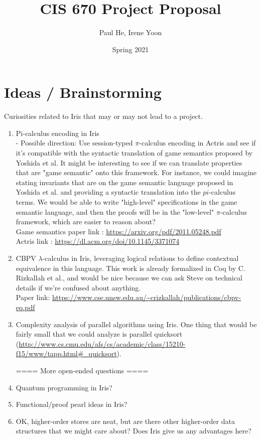\documentclass[11pt,twoside]{article}
\begin{document}
\title{CIS 670 Project Proposal}
\author{Paul He, Irene Yoon}
\date{Spring 2021}

\maketitle{}


\section{Ideas / Brainstorming}
Curiosities related to Iris that may or may not lead to a 
project.
\begin{enumerate} 
    \item Pi-calculus encoding in Iris \\
    - Possible direction: Use session-typed $\pi$-calculus encoding in Actris
    and see if it's compatible with the syntactic translation of game 
    semantics proposed by Yoshida et al. It might be interesting to see
    if we can translate properties that are "game semantic" onto this 
    framework.
    For instance, we could imagine stating invariants that are on the game 
    semantic language proposed in Yoshida et al. and providing a syntactic 
    translation into the $pi$-calculus terms. We would be able to write 
    "high-level" specifications in the game semantic language, and then
    the proofs will be in the "low-level" $\pi$-calculus framework, which
    are easier to reason about?\\
    Game semantics paper link : \url{https://arxiv.org/pdf/2011.05248.pdf}\\
    Actris link : \url{https://dl.acm.org/doi/10.1145/3371074}
    \item CBPV $\lambda$-calculus in Iris, leveraging logical relations to
    define contextual equivalence in this language. This work is already 
    formalized in Coq by C. Rizkallah et al., and would be nice because
    we can ask Steve on technical details if we're confused about anything.\\
    Paper link:
    \url{https://www.cse.unsw.edu.au/~crizkallah/publications/cbpv-eq.pdf}
    \item Complexity analysis of parallel algorithms using Iris.
    One thing that would be fairly small that we could analyze is parallel 
    quicksort (\url{http://www.cs.cmu.edu/afs/cs/academic/class/15210-f15/www/tapp.html#_quicksort}).

    ==== More open-ended questions ====
    \item Quantum programming in Iris?
    \item Functional/proof pearl ideas in Iris?
    \item OK, higher-order stores are neat, but are there other higher-order
    data structures that we might care about? Does Iris give us any
    advantages here? 
\end{enumerate}
\end{document}
